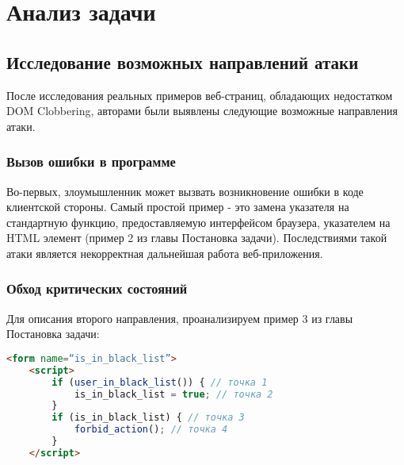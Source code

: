 
\chapter{Анализ задачи}\label{Analysis}

\section{Исследование возможных направлений атаки}

После исследования реальных примеров веб-страниц, обладающих недостатком DOM Clobbering, авторами были выявлены следующие возможные направления атаки.
\bigskip

\subsection{Вызов ошибки в программе}
Во-первых, злоумышленник может вызвать возникновение ошибки в коде клиентской стороны. Самый простой пример - это замена указателя на стандартную функцию, предоставляемую интерфейсом браузера, указателем на HTML элемент (пример 2 из главы Постановка задачи). Последствиями такой атаки является некорректная дальнейшая работа веб-приложения.


\subsection{Обход критических состояний}
Для описания второго направления, проанализируем пример 3 из главы Постановка задачи:

\begin{lstlisting}[language=HTML]
	<form name=“is_in_black_list”>
	<script>
		if (user_in_black_list()) { // точка 1
			is_in_black_list = true; // точка 2
		}
		if (is_in_black_list) { // точка 3
			forbid_action(); // точка 4
		}
	</script>
\end{lstlisting}
\bigskip

